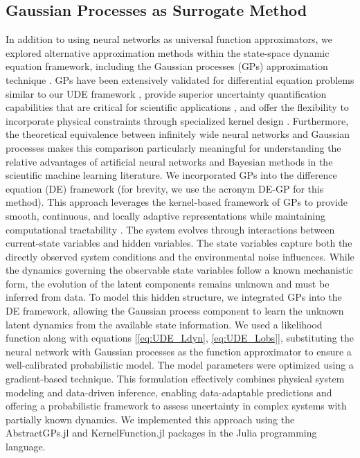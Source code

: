 \documentclass[openacc]{rsproca_new}%
\begin{document}
\subsection{Gaussian Processes as Surrogate Method}
In addition to using neural networks as universal function approximators, we explored alternative approximation methods within the state-space dynamic equation framework, including the Gaussian processes (GPs) approximation technique \cite{olivier_bayesian_2021}. GPs have been extensively validated for differential equation problems similar to our UDE framework \cite{pnas.2416637122, RAISSI2019686, ml_ld_gp}, provide superior uncertainty quantification capabilities that are critical for scientific applications \cite{yang_liu}, and offer the flexibility to incorporate physical constraints through specialized kernel design \cite{solin2020hilbert}. Furthermore, the theoretical equivalence between infinitely wide neural networks and Gaussian processes \cite{Lee2017DeepNN} makes this comparison particularly meaningful for understanding the relative advantages of artificial neural networks and Bayesian methods in the scientific machine learning literature.
% 
We incorporated GPs into the difference equation (DE) framework (for brevity, we use the acronym DE-GP for this method). This approach leverages the kernel-based framework of GPs to provide smooth, continuous, and locally adaptive representations while maintaining computational tractability \cite{turner_2010}. 
% 
The system evolves through interactions between current-state variables and hidden variables. The state variables capture both the directly observed system conditions and the environmental noise influences. While the dynamics governing the observable state variables follow a known mechanistic form, the evolution of the latent components remains unknown and must be inferred from data. To model this hidden structure, we integrated GPs into the DE framework, allowing the Gaussian process component to learn the unknown latent dynamics from the available state information.
% 
We used a likelihood function along with equations [\eqref{eq:UDE_Ldyn}, \eqref{eq:UDE_Lobs}], substituting the neural network with Gaussian processes as the function approximator to ensure a well-calibrated probabilistic model. The model parameters were optimized using a gradient-based technique. This formulation effectively combines physical system modeling and data-driven inference, enabling data-adaptable predictions and offering a probabilistic framework to assess uncertainty in complex systems with partially known dynamics. We implemented this approach using the AbstractGPs.jl \cite{david_widmann_2024_10801764} and KernelFunction.jl \cite{theo_galy_fajou_2024_12793559} packages in the Julia programming language. 
\end{document}
